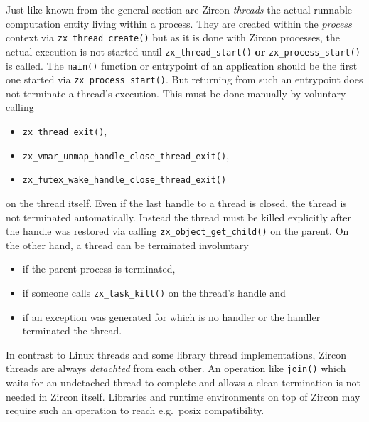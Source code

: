 Just like known from the general section are Zircon \textit{threads} the actual runnable computation entity living within a process.
They are created within the \textit{process} context via \texttt{zx\_thread\_create()} but as it is done with Zircon processes, the actual execution is not started until \texttt{zx\_thread\_start()} \textbf{or} \texttt{zx\_process\_start()} is called.
The \texttt{main()} function or entrypoint of an application should be the first one started via \texttt{zx\_process\_start()}.
But returning from such an entrypoint does not terminate a thread's execution.
This must be done manually by voluntary calling 
\begin{itemize}
    \item \texttt{zx\_thread\_exit()},
    \item \texttt{zx\_vmar\_unmap\_handle\_close\_thread\_exit()},
    \item \texttt{zx\_futex\_wake\_handle\_close\_thread\_exit()}
\end{itemize}
on the thread itself\cite{zircon-thread}.
Even if the last handle to a thread is closed, the thread is not terminated automatically.
Instead the thread must be killed explicitly after the handle was restored via calling \texttt{zx\_object\_get\_child()} on the parent.
On the other hand, a thread can be terminated involuntary 
\begin{itemize}
    \item if the parent process is terminated,
    \item if someone calls \texttt{zx\_task\_kill()} on the thread's handle and
    \item if an exception was generated for which is no handler or the handler terminated the thread\cite{zircon-thread}. 
\end{itemize}

In contrast to Linux threads and some library thread implementations, Zircon threads are always \textit{detachted} from each other.
An operation like \texttt{join()} which waits for an undetached thread to complete and allows a clean termination is not needed in Zircon itself.
Libraries and runtime environments on top of Zircon may require such an operation to reach e.g.\ \ac{posix} compatibility\cite{zircon-thread}.


